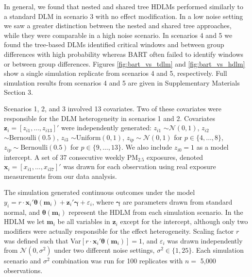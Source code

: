 \documentclass[12pt]{article}
\begin{document}
In general, we found that nested and shared tree HDLMs performed similarly to a standard DLM in scenario 3 with no effect modification. In a low noise setting we saw a greater distinction between the nested and shared tree approaches, while they were comparable in a high noise scenario. In scenarios 4 and 5 we found the tree-based DLMs identified critical windows and between group differences with high probability whereas BART often failed to identify windows or between group differences. Figures \ref{fig:bart_vs_tdlm} and \ref{fig:bart_vs_hdlm} show a single simulation replicate from scenarios 4 and 5, respectively. Full simulation results from scenarios 4 and 5 are given in Supplementary Materials Section 3.




Scenarios 1, 2, and 3 involved 13 covariates. Two of these covariates were responsible for the DLM heterogeneity in scenarios 1 and 2. Covariates $\mathbf{z}_i=[z_{i1},\ldots,z_{i13}]'$ were independently generated: $z_{i1}$ $\sim\mathcal{N}(0,1)$, $z_{i2}$ $\sim\text{Bernoulli}(0.5)$, $z_{i3}$ $\sim\text{Uniform}(0,1)$, $z_{ip}\sim\mathcal{N}(0,1)$ for $p\in\{4,\ldots,8\}$, $z_{ip}\sim\text{Bernoulli}(0.5)$ for $p\in\{9,\ldots,13\}$. We also include $z_{i0}=1$ as a model intercept. A set of 37 consecutive weekly PM$_{2.5}$ exposures, denoted $\mathbf{x}_i=[x_{i1},\ldots,x_{i37}]'$ was drawn for each observation using real exposure measurements from our data analysis.

The simulation generated continuous outcomes under the model $y_i= r\cdot\mathbf{x}_i'\boldsymbol\theta(\mathbf{m}_i)+\mathbf{z}_i'\boldsymbol{\gamma}+\varepsilon_i$,
where $\boldsymbol{\gamma}$ are parameters drawn from standard normal, and $\boldsymbol\theta(\mathbf{m}_i)$ represent the HDLM from each simulation scenario. In the HDLM we let $\mathbf{m}_i$ be all variables in $\mathbf{z}_i$ except for the intercept, although only two modifiers were actually responsible for the effect heterogeneity. Scaling factor $r$ was defined such that Var$[r\cdot \mathbf{x}_i'\boldsymbol\theta(\mathbf{m}_i)]=1$, and $\varepsilon_i$ was drawn independently from $\mathcal{N}(0,\sigma^2)$ under two different noise settings, $\sigma^2\in\{1,25\}$. Each simulation scenario and $\sigma^2$ combination was run for 100 replicates with $n=$ 5,000 observations.
\end{document}

